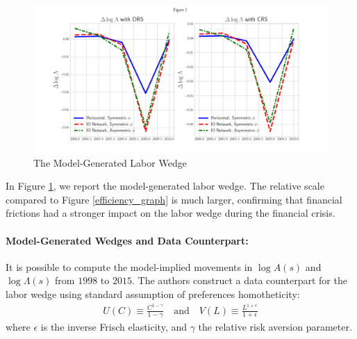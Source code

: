 \documentclass[english,letter,11pt,twoside]{article}
\begin{document}
\begin{figure}[!h]
\centering
\includegraphics[scale=0.5]{figure2.png}
\caption{The Model-Generated Labor Wedge}
\label{labor_graph}
\end{figure}
In Figure \ref{labor_graph}, we report the model-generated labor wedge. The relative scale compared to Figure \ref{efficiency_graph} is much larger, confirming that financial frictions had a stronger impact on the labor wedge during the financial crisis. 


\paragraph*{Model-Generated Wedges and Data Counterpart:} It is possible to compute the model-implied movements in $\log A(s)$ and $\log \Lambda (s)$ from $1998$ to $2015$. The authors construct a data counterpart for the labor wedge using standard assumption of preferences homotheticity:
\begin{align*}
	U(C) \equiv \frac{C^{1 - \gamma}}{1 - \gamma} \quad \text{and} \quad V(L) \equiv \frac{L^{1+\epsilon}}{1 + \epsilon}
\end{align*} 
where $\epsilon$ is the inverse Frisch elasticity, and $\gamma$ the relative risk aversion parameter.
\end{document}

